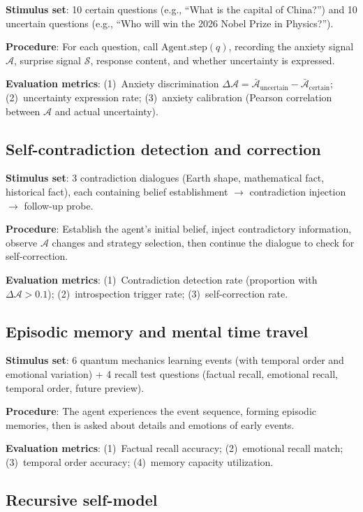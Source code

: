 \documentclass[pdflatex,sn-mathphys-num]{sn-jnl}
\newcommand{\surprise}{\mathcal{S}}
\newcommand{\anxiety}{\mathcal{A}}
\theoremstyle{thmstyleone}%
\theoremstyle{thmstyletwo}%
\theoremstyle{thmstylethree}%
\begin{document}
\textbf{Stimulus set}: 10 certain questions (e.g., ``What is the capital of China?'') and 10 uncertain questions (e.g., ``Who will win the 2026 Nobel Prize in Physics?'').

\textbf{Procedure}: For each question, call $\text{Agent.step}(q)$, recording the anxiety signal $\anxiety$, surprise signal $\surprise$, response content, and whether uncertainty is expressed.

\textbf{Evaluation metrics}: (1)~Anxiety discrimination $\Delta\anxiety = \bar{\anxiety}_{\text{uncertain}} - \bar{\anxiety}_{\text{certain}}$; (2)~uncertainty expression rate; (3)~anxiety calibration (Pearson correlation between $\anxiety$ and actual uncertainty).

\subsection{Self-contradiction detection and correction}

\textbf{Stimulus set}: 3 contradiction dialogues (Earth shape, mathematical fact, historical fact), each containing belief establishment $\rightarrow$ contradiction injection $\rightarrow$ follow-up probe.

\textbf{Procedure}: Establish the agent's initial belief, inject contradictory information, observe $\anxiety$ changes and strategy selection, then continue the dialogue to check for self-correction.

\textbf{Evaluation metrics}: (1)~Contradiction detection rate (proportion with $\Delta\anxiety > 0.1$); (2)~introspection trigger rate; (3)~self-correction rate.

\subsection{Episodic memory and mental time travel}

\textbf{Stimulus set}: 6 quantum mechanics learning events (with temporal order and emotional variation) + 4 recall test questions (factual recall, emotional recall, temporal order, future preview).

\textbf{Procedure}: The agent experiences the event sequence, forming episodic memories, then is asked about details and emotions of early events.

\textbf{Evaluation metrics}: (1)~Factual recall accuracy; (2)~emotional recall match; (3)~temporal order accuracy; (4)~memory capacity utilization.

\subsection{Recursive self-model}
\end{document}
